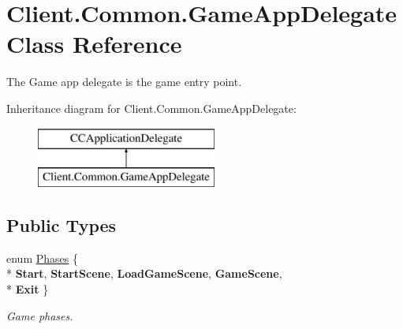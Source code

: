 \hypertarget{classClient_1_1Common_1_1GameAppDelegate}{}\section{Client.\+Common.\+Game\+App\+Delegate Class Reference}
\label{classClient_1_1Common_1_1GameAppDelegate}


The Game app delegate is the game entry point.  


Inheritance diagram for Client.\+Common.\+Game\+App\+Delegate\+:\begin{figure}[H]
\begin{center}
\leavevmode
\includegraphics[height=2.000000cm]{classClient_1_1Common_1_1GameAppDelegate}
\end{center}
\end{figure}
\subsection*{Public Types}
\begin{DoxyCompactItemize}
\item 
enum \hyperlink{classClient_1_1Common_1_1GameAppDelegate_aa0175b28b3986f7cf57680f07558ab3c}{Phases} \{ \\*
{\bfseries Start}, 
{\bfseries Start\+Scene}, 
{\bfseries Load\+Game\+Scene}, 
{\bfseries Game\+Scene}, 
\\*
{\bfseries Exit}
 \}\begin{DoxyCompactList}\small\item\em Game phases. \end{DoxyCompactList}
\end{DoxyCompactItemize}

